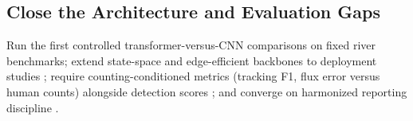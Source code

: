\subsection{Close the Architecture and Evaluation Gaps}
Run the first controlled transformer-versus-CNN comparisons on fixed river benchmarks; extend state-space and edge-efficient backbones to deployment studies \cite{Sun2025,Yan2025}; require counting-conditioned metrics (tracking F1, flux error versus human counts) alongside detection scores \cite{Lee2025,JiaFlux2025}; and converge on harmonized reporting discipline \cite{Hurley2023}.
